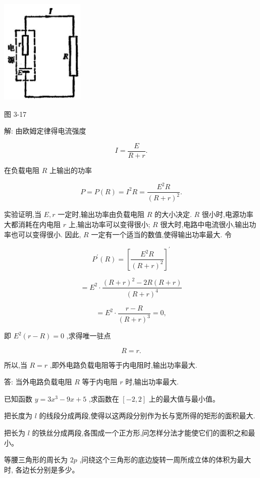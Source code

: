 \documentclass[lang=cn,newtx,12pt,scheme=chinese]{elegantbook}
\begin{document}
\begin{center}
\includegraphics[max width=0.3\textwidth]{images/01912c18-5c3f-733d-b775-749ba9897a9d_152_349261.jpg}
\end{center}

图 3-17

解: 由欧姆定律得电流强度

\[
I = \frac{E}{R + r}.
\]

在负载电阻 \(R\) 上输出的功率

\[
P = P\left( R\right) = {I}^{2}R = \frac{{E}^{2}R}{{\left( R + r\right) }^{2}}.
\]

实验证明,当 \(E,r\) 一定时,输出功率由负载电阻 \(R\) 的大小决定. \(R\) 很小时,电源功率大都消耗在内电阻 \(r\) 上,输出功率可以变得很小; \(R\) 很大时,电路中电流很小,输出功率也可以变得很小. 因此, \(R\) 一定有一个适当的数值,使得输出功率最大. 令

\[
{P}^{\prime }\left( R\right) = {\left\lbrack \frac{{E}^{2}R}{{\left( R + r\right) }^{2}}\right\rbrack }^{\prime }
\]

\[
= {E}^{2} \cdot \frac{{\left( R + r\right) }^{2} - {2R}\left( {R + r}\right) }{{\left( R + r\right) }^{4}}
\]

\[
= {E}^{2} \cdot \frac{r - R}{{\left( R + r\right) }^{3}} = 0,
\]

即 \({E}^{2}\left( {r - R}\right) = 0\) ,求得唯一驻点

\[
R = r\text{.}
\]

所以,当 \(R = r\) ,即外电路负载电阻等于内电阻时,输出功率最大.

答: 当外电路负载电阻 \(R\) 等于内电阻 \(r\) 时,输出功率最大.

\begin{problemset}[练习]

\item 已知函数 \(y = 3{x}^{3} - {9x} + 5\) ,求函数在 \(\left\lbrack {-2,2}\right\rbrack\) 上的最大值与最小值。

\item 把长度为 \(l\) 的线段分成两段,使得以这两段分别作为长与宽所得的矩形的面积最大.

\item 把长为 \(l\) 的铁丝分成两段,各围成一个正方形,问怎样分法才能使它们的面积之和最小。

\item 等腰三角形的周长为 \({2p}\) ,问绕这个三角形的底边旋转一周所成立体的体积为最大时, 各边长分别是多少。

\end{problemset}
\end{document}
